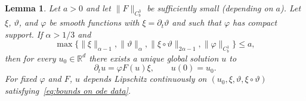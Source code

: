 \documentclass[a4paper,11pt]{article}
\newtheorem{lemma}[theorem]{Lemma}
\theoremstyle{remark}
\newcommand{\R}{\mathbb{R}}
\newcommand{\reso}{\,\mathord{\circ}\,}
\begin{document}
\begin{lemma}\label{lemma:ode conditional existence uniqueness}
  Let $a>0$ and let $\| F\|_{C^{3}_{b}}$ be sufficiently small (depending on $a$). Let $\xi$, $\vartheta$,
  and $\varphi$ be smooth functions with $\xi = \partial_{t} \vartheta$ and
  such that $\varphi$ has compact support. If $\alpha >1/3$ and
  \begin{equation}\label{eq:bounds on ode data}
     \max \{ \| \xi \|_{\alpha -1} , \| \vartheta \|_{\alpha} , \| \xi \reso \vartheta \|_{2 \alpha -1} , \| \varphi \|_{C^{1}_{b}} \} \leqslant a,
  \end{equation}
  then for every $u_0 \in \R^d$ there exists a unique global solution $u$ to
  \[
     \partial_{t} u= \varphi F ( u ) \xi, \qquad u(0) = u_0.
  \]
  For fixed $\varphi$ and $F$, $u$ depends Lipschitz continuously on $(u_0, \xi, \vartheta , \xi \reso \vartheta)$ satisfying~\eqref{eq:bounds on ode data}.
\end{lemma}
\end{document}
